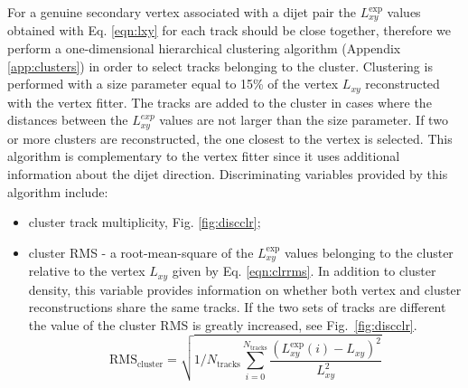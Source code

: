 \begin{enumerate}
For a genuine secondary vertex associated with a dijet pair the $L_{xy}^\text{exp}$ values obtained with Eq.
\ref{eqn:lxy} for each track should be close
 together, therefore we perform a one-dimensional hierarchical clustering algorithm (Appendix 
\ref{app:clusters})
in order to select tracks belonging to the cluster. 
Clustering is performed with a size parameter equal to 15\% of 
the vertex $L_{xy}$ reconstructed with the vertex fitter. 
The tracks are added to the cluster in cases where the distances between the $L_{xy}^{exp}$
values are not larger than the size parameter. 
 If two or more clusters 
are reconstructed, the one closest to the vertex is selected. 
This algorithm is complementary to the vertex fitter
since it uses additional information about the dijet direction. Discriminating variables provided
 by this algorithm include:
\begin{itemize}
\item cluster track multiplicity, Fig. \ref{fig:discclr};
\item cluster RMS - a root-mean-square of the $L_{xy}^\text{exp}$ values belonging to the cluster
 relative to the vertex $L_{xy}$ given by Eq. \ref{eqn:clrrms}. In addition to cluster density, this
variable provides information on whether both vertex and cluster reconstructions share the same tracks.
 If the two sets of tracks
are different the value of the cluster RMS is greatly increased, see Fig.~\ref{fig:discclr}.
\begin{equation}
\text{RMS}_\text{cluster} = \sqrt{1/N_\text{tracks}\sum_{i=0}^{N_\text{tracks}}\frac{ \left(L_{xy}^\text{exp}(i) - L_{xy}\right)^2}{L_{xy}^2}}
\label{eqn:clrrms}
\end{equation}
\end{itemize}


\end{enumerate}
